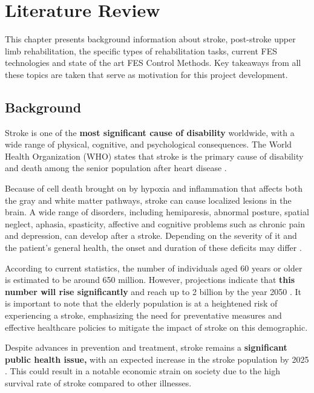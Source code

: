 \chapter{Literature Review}

This chapter presents background information about stroke, post-stroke upper limb rehabilitation, the specific types of rehabilitation tasks, current FES technologies and state of the art FES Control Methods. Key takeaways from all these topics are taken that serve as motivation for this project development. 

\section{Background}

Stroke is one of the \textbf{most significant cause of disability }worldwide, with a wide range of physical, cognitive, and psychological consequences. The World Health Organization (WHO) states that stroke is the primary cause of disability and death among the senior population after heart disease \cite{WHO}.

Because of cell death brought on by hypoxia and inflammation that affects both the gray and white matter pathways, stroke can cause localized lesions in the brain. A wide range of disorders, including hemiparesis, abnormal posture, spatial neglect, aphasia, spasticity, affective and cognitive problems such as chronic pain and depression, can develop after a stroke. Depending on the severity of it and the patient's general health, the onset and duration of these deficits may differ \cite{Corbetta2015}.

 According to current statistics, the number of individuals aged 60 years or older is estimated to be around 650 million. However, projections indicate that \textbf{this number will rise significantly }and reach up to 2 billion by the year 2050 \cite{Cardiovascular}. It is important to note that the elderly population is at a heightened risk of experiencing a stroke, emphasizing the need for preventative measures and effective healthcare policies to mitigate the impact of stroke on this demographic.

Despite advances in prevention and treatment, stroke remains a \textbf{significant public health issue,} with an expected increase in the stroke population by 2025 \cite{Anwer2022}. This could result in a notable economic strain on society due to the high survival rate of stroke compared to other illnesses.

